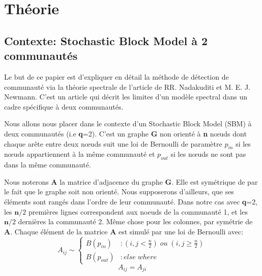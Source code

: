 \section{Théorie}
\subsection{Contexte: Stochastic Block Model à 2 communautés}
Le but de ce papier est d'expliquer en détail la méthode de détection de communauté via la théorie spectrale de l'article de RR. Nadakuditi et M. E. J. Newmann.
C'est un article qui décrit les limites d'un modèle spectral dans un cadre spécifique à deux communautés.

Nous allons nous placer dans le contexte d'un Stochastic Block Model (SBM) à deux communautés (i.e \textbf{q}=2).
C'est un graphe \textbf{G} non orienté à \textbf{n} nœuds dont chaque arête entre deux nœuds suit une loi de Bernoulli de paramètre $p_{in}$ si les nœuds appartiennent à la même communauté et $p_{out}$ si les nœuds ne sont pas dans la même communauté.  

Nous noterons \textbf{A} la matrice d'adjacence du graphe \textbf{G}.
Elle est symétrique de par le fait que le graphe soit non orienté.
Nous supposerons d'ailleurs, que ses éléments sont rangés dans l'ordre de leur communauté.
Dans notre cas avec \textbf{q}=2, les $\mathbf{n}/2$ premières lignes correspondent aux noeuds de la communauté 1, et les $\mathbf{n}/2$ dernières la communauté 2.
Même chose pour les colonnes, par symétrie de \textbf{A}.
Chaque élément de la matrice \textbf{A} est simulé par une loi de Bernoulli avec: 
\begin{equation} 
 A_{ij} \sim \left\{
  \begin{array}{lr}
    B(p_{in}) & : (i,j < \frac{n}{2}) \; ou \; (i,j \ge \frac{n}{2}) \\
    B(p_{out}) & : else \; where
  \end{array}
\right.\nonumber
\end{equation}
\begin{equation} 
A_{ij} = A_{ji}\nonumber
\end{equation}


